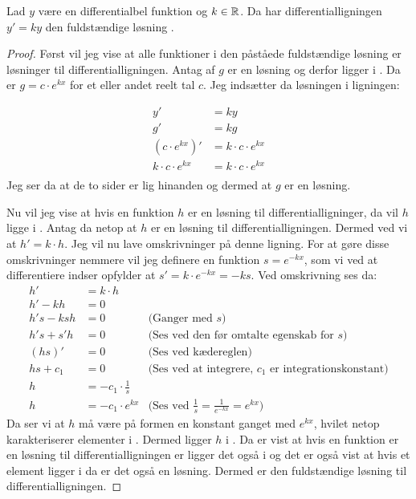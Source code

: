 \begin{thm}\label{thm:y'=k*y}
Lad $y$ være en differentialbel funktion og $k\in \mathbb{R}$. Da har  differentialligningen $y' = ky$ den fuldstændige løsning \LosEks.
\end{thm}
\begin{proof}
Først vil jeg vise at alle funktioner i den påståede fuldstændige løsning er løsninger til differentialligningen.
Antag af $g$ er en løsning og derfor ligger i \LosEks .
Da er $g=c\cdot e^{kx}$ for et eller andet reelt tal $c$.
Jeg indsætter da løsningen i ligningen: 

\begin{align*}
y' &= ky\\
g' &= kg\\
(c\cdot e^{kx})' &= k\cdot c\cdot e^{kx}\\
k\cdot c\cdot e^{kx} &= k\cdot c\cdot e^{kx}\\
\end{align*}
Jeg ser da at de to sider er lig hinanden og dermed at $g$ er en løsning. 

Nu vil jeg vise at hvis en funktion $h$ er en løsning til differentialligninger, da vil $h$ ligge i \LosEks.
Antag da netop at $h$ er en løsning til differentialligningen. 
Dermed ved vi at $h'=k\cdot h$.
Jeg vil nu lave omskrivninger på denne ligning. 
For at gøre disse omskrivninger nemmere vil jeg definere en funktion $s=e^{-kx}$, som vi ved at differentiere indser opfylder at $s'=k \cdot e^{-kx} = -ks$.
Ved omskrivning ses da:
\begin{align*}
h'&=k\cdot h \\
h'-kh &= 0\\
h's-ksh&=0 		& \text{(Ganger med }s\text{)}\\
h's+s'h&=0		& \text{(Ses ved den før omtalte egenskab for $s$)}\\
(hs)'&=0		&\text{(Ses ved kædereglen)}\\
hs+c_1 &= 0		&\text{(Ses ved at integrere, $c_1$ er integrationskonstant)}\\
h&= -c_1 \cdot \frac{1}{s}\\
h&= -c_1 \cdot e^{kx} &\text{(Ses ved $\frac{1}{s}=\frac{1}{e^{-kx}} = e^{kx}$)}
\end{align*}
Da ser vi at $h$ må være på formen en konstant ganget med $e^{kx}$, hvilet netop karakteriserer elementer i \LosEks. 
Dermed ligger $h$ i \LosEks.
Da er vist at hvis en funktion er en løsning til differentialligningen er ligger det også i \LosEks og det er også vist at hvis et element ligger i \LosEks da er det også en løsning. 
Dermed er \LosEks den fuldstændige løsning til differentialligningen. 
\end{proof}


